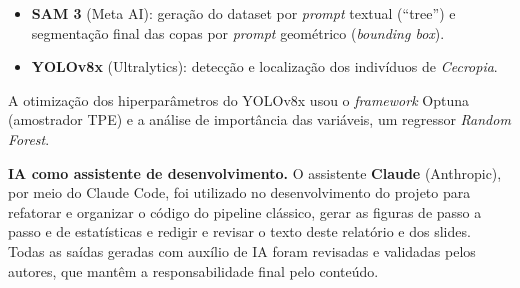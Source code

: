 \documentclass[12pt, a4paper]{article}
\begin{document}
\begin{itemize}
    \item \textbf{SAM 3} (Meta AI): geração do dataset por \textit{prompt} textual
    (``tree'') e segmentação final das copas por \textit{prompt} geométrico
    (\textit{bounding box}).
    \item \textbf{YOLOv8x} (Ultralytics): detecção e localização dos indivíduos de
    \textit{Cecropia}.
\end{itemize}

A otimização dos hiperparâmetros do YOLOv8x usou o \textit{framework} Optuna
(amostrador TPE) e a análise de importância das variáveis, um regressor
\textit{Random Forest}.

\textbf{IA como assistente de desenvolvimento.} O assistente \textbf{Claude}
(Anthropic), por meio do Claude Code, foi utilizado no desenvolvimento do projeto
para refatorar e organizar o código do pipeline clássico, gerar as figuras de
passo a passo e de estatísticas e redigir e revisar o texto deste relatório e dos
slides. Todas as saídas geradas com auxílio de IA foram revisadas e validadas
pelos autores, que mantêm a responsabilidade final pelo conteúdo.
\end{document}
